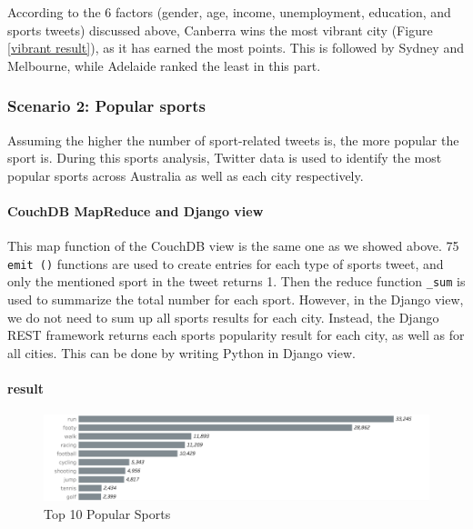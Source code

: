 According to the 6 factors (gender, age, income, unemployment, education, and sports tweets) discussed above, Canberra wins the most vibrant city (Figure \ref{vibrant result}), as it has earned the most points. This is followed by Sydney and Melbourne, while Adelaide ranked the least in this part.

\subsubsection{Scenario 2: Popular sports}
Assuming the higher the number of sport-related tweets is, the more popular the sport is. During this sports analysis, Twitter data is used to identify the most popular sports across Australia as well as each city respectively. 

\paragraph{CouchDB MapReduce and Django view}
This map function of the CouchDB view is the same one as we showed above. 75 \texttt{emit ()} functions are used to create entries for each type of sports tweet, and only the mentioned sport in the tweet returns 1. Then the reduce function \texttt{_sum} is used to summarize the total number for each sport. However, in the Django view, we do not need to sum up all sports results for each city. Instead, the Django REST framework returns each sports popularity result for each city, as well as for all cities. This can be done by writing Python in Django view.

\paragraph{result}
\begin{figure}[h!]
\centerline{\includegraphics[width=6in]{Figures/popular sports.png}}
\caption{Top 10 Popular Sports  \label{popular sports}}
\end{figure}

